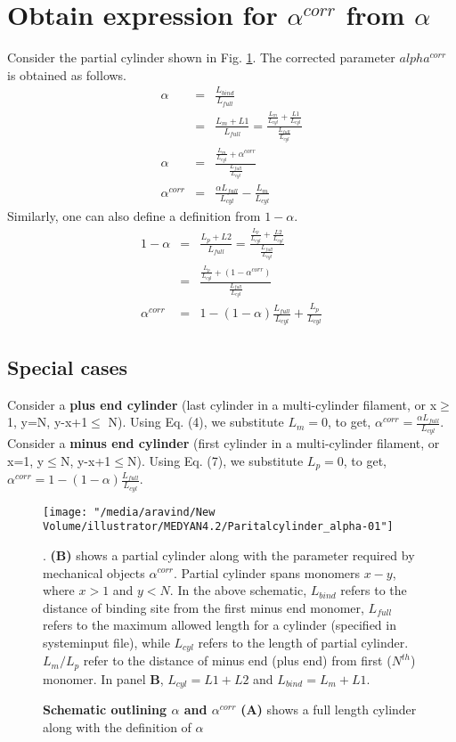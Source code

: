 \documentclass[11pt, oneside]{article}
\begin{document}
\section{Obtain expression for $\alpha^{corr}$ from $\alpha$}
Consider the partial cylinder shown in Fig. \ref{fig:schematic}. The corrected parameter $alpha^{corr}$ is obtained as follows.
\begin{eqnarray}
\alpha &=& \frac{L_{bind}}{L_{full}}\\
&=&\frac{L_m + L1}{L_{full}} = \frac{\frac{L_m}{L_{cyl}} + \frac{L1}{L_{cyl}}}{\frac{L_{full}}{L_{cyl}}}\\
\alpha &=&\frac{\frac{L_m}{L_{cyl}} + \alpha^{corr}}{\frac{L_{full}}{L_{cyl}}}\\
\alpha^{corr} &=& \frac{\alpha L_{full}}{L_{cyl}} - \frac{L_m}{L_{cyl}}
\end{eqnarray}
Similarly, one can also define a definition from $1-\alpha$.
\begin{eqnarray}
1-\alpha &=& \frac{L_p + L2}{L_{full}} = \frac{\frac{L_p}{L_{cyl}} + \frac{L2}{L_{cyl}}}{\frac{L_{full}}{L_{cyl}}}\\
&=& \frac{\frac{L_p}{L_{cyl}} + (1-\alpha^{corr})}{\frac{L_{full}}{L_{cyl}}}\\
\alpha^{corr} &=& 1-(1-\alpha)\frac{L_{full}}{L_{cyl}} + \frac{L_p}{L_{cyl}}
\end{eqnarray}
\subsection{Special cases}
Consider a \textbf{plus end cylinder} (last cylinder in a multi-cylinder filament, or x$\geq$1, y=N, y-x+1$\leq$ N). Using Eq. (4), we substitute $L_m = 0$, to get,  $\alpha^{corr} = \frac{\alpha L_{full}}{L_{cyl}}$.\newline
Consider a \textbf{minus end cylinder} (first cylinder in a multi-cylinder filament, or x=1, y$\leq$N, y-x+1$\leq$N). Using Eq. (7), we substitute $L_p = 0$, to get,  $\alpha^{corr} = 1-(1-\alpha)\frac{L_{full}}{L_{cyl}}$.

\begin{figure}
  \texttt{[image: "/media/aravind/New Volume/illustrator/MEDYAN4.2/Paritalcylinder\_alpha-01"]}
 \caption{\textbf{Schematic outlining $\alpha$ and $\alpha^{corr}$} \textbf{(A)} shows a full length cylinder along with the definition of $\alpha$}. \textbf{(B)} shows a partial cylinder along with the parameter required by mechanical objects $\alpha^{corr}$. Partial cylinder spans monomers $x-y$, where $x>1$ and $y<N$. In the above schematic, $L_{bind}$ refers to the distance of binding site from the first minus end monomer, $L_{full}$ refers to the maximum allowed length for a cylinder (specified in systeminput file), while $L_{cyl}$ refers to the length of partial cylinder. $L_{m}/L_{p}$ refer to the distance of minus end (plus end) from first ($N^{th}$) monomer. In panel \textbf{B}, $L_{cyl} = L1 + L2$ and $L_{bind} = L_{m} + L1$.
  \label{fig:schematic}
\end{figure}
\end{document}
